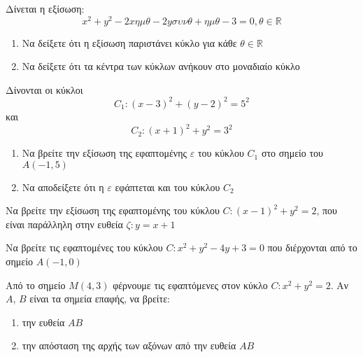 \documentclass{../../presentation}
\begin{document}
\begin{askisi}
  Δίνεται η εξίσωση:
  $$x^2+y^2-2xημθ-2yσυνθ+ημθ-3=0,θ\in\mathbb{R}$$
  \begin{enumerate}
    \item<1-> Να δείξετε ότι η εξίσωση παριστάνει κύκλο για κάθε $θ\in\mathbb{R}$
    \item<2-> Να δείξετε ότι τα κέντρα των κύκλων ανήκουν στο μοναδιαίο κύκλο
  \end{enumerate}

\end{askisi}

\begin{askisi}
  Δίνονται οι κύκλοι
  $$C_1:(x-3)^2+(y-2)^2=5^2$$
  και
  $$C_2:(x+1)^2+y^2=3^2$$
  \begin{enumerate}
    \item<1-> Να βρείτε την εξίσωση της εφαπτομένης $ε$ του κύκλου $C_1$ στο σημείο του $Α(-1,5)$
    \item<2-> Να αποδείξετε ότι η $ε$ εφάπτεται και του κύκλου $C_2$
  \end{enumerate}

\end{askisi}

\begin{askisi}
  Να βρείτε την εξίσωση της εφαπτομένης του κύκλου $C:(x-1)^2+y^2=2$, που είναι παράλληλη στην ευθεία $ζ:y=x+1$

\end{askisi}

\begin{askisi}
  Να βρείτε τις εφαπτομένες του κύκλου $C:x^2+y^2-4y+3=0$ που διέρχονται από το σημείο $Α(-1,0)$

\end{askisi}

\begin{askisi}
  Από το σημείο $Μ(4,3)$ φέρνουμε τις εφαπτόμενες στον κύκλο $C:x^2+y^2=2$. Αν $Α$, $Β$ είναι τα σημεία επαφής, να βρείτε:
  \begin{enumerate}
    \item<1-> την ευθεία $ΑΒ$
    \item<2-> την απόσταση της αρχής των αξόνων από την ευθεία $ΑΒ$
  \end{enumerate}

\end{askisi}
\end{document}

